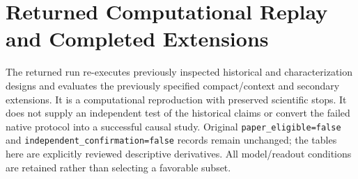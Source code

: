 \section{Returned Computational Replay and Completed Extensions}
\label{app:reproduction}
The returned run re-executes previously inspected historical and characterization designs and evaluates the previously specified compact/context and secondary extensions. It is a computational reproduction with preserved scientific stops. It does not supply an independent test of the historical claims or convert the failed native protocol into a successful causal study. Original \texttt{paper\_eligible=false} and \texttt{independent\_confirmation=false} records remain unchanged; the tables here are explicitly reviewed descriptive derivatives. All model/readout conditions are retained rather than selecting a favorable subset.

